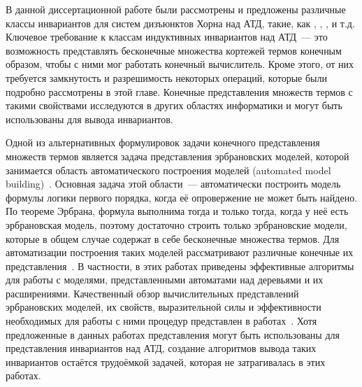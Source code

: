 В данной диссертационной работе были рассмотрены и предложены различные классы инвариантов для систем дизъюнктов Хорна над АТД, такие, как \elemclass{}, \regclass{}, \syncRegFlatClass{}, \syncRegFullClass{} и т.\:д. Ключевое требование к классам индуктивных инвариантов над АТД~--- это возможность представлять бесконечные множества кортежей термов конечным образом, чтобы с ними мог работать конечный вычислитель. Кроме этого, от них требуется замкнутость и разрешимость некоторых операций, которые были подробно рассмотрены в этой главе. Конечные представления множеств термов с такими свойствами исследуются в других областях информатики и могут быть использованы для вывода инвариантов.

Одной из альтернативных формулировок задачи конечного представления множеств термов является задача представления эрбрановских моделей, которой занимается область автоматического построения моделей (automated model building)~\cite{caferra2013automated}. Основная задача этой области~--- автоматически построить модель формулы логики первого порядка, когда её опровержение не может быть найдено. По теореме Эрбрана, формула выполнима тогда и только тогда, когда у неё есть эрбрановская модель, поэтому достаточно строить только эрбрановские модели, которые в общем случае содержат в себе бесконечные множества термов. Для автоматизации построения таких моделей рассматривают различные конечные их представления~\cite{fermuller2007model,fermuller2005model,teucke2019expressivity,gramlich2002algorithmic}. В частности, в этих работах приведены эффективные алгоритмы для работы с моделями, представленными автоматами над деревьями и их расширениями. Качественный обзор вычислительных представлений эрбрановских моделей, их свойств, выразительной силы и эффективности необходимых для работы с ними процедур представлен в работах~\cite{matzinger1998computational, matzinger2000computational}. Хотя предложенные в данных работах представления могут быть использованы для представления инвариантов над АТД, создание алгоритмов вывода таких инвариантов остаётся трудоёмкой задачей, которая не затрагивалась в этих работах.

